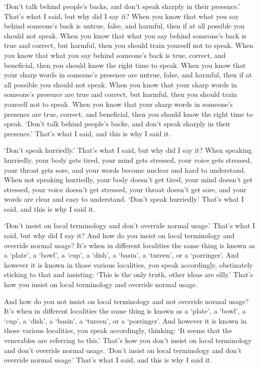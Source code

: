 \documentclass[12pt,openany]{book}%
\begin{document}
‘Don’t talk behind people’s backs, and don’t speak sharply in their presence.’ That’s what I said, but why did I say it? When you know that what you say behind someone’s back is untrue, false, and harmful, then if at all possible you should not speak. When you know that what you say behind someone’s back is true and correct, but harmful, then you should train yourself not to speak. When you know that what you say behind someone’s back is true, correct, and beneficial, then you should know the right time to speak. When you know that your sharp words in someone’s presence are untrue, false, and harmful, then if at all possible you should not speak. When you know that your sharp words in someone’s presence are true and correct, but harmful, then you should train yourself not to speak. When you know that your sharp words in someone’s presence are true, correct, and beneficial, then you should know the right time to speak. ‘Don’t talk behind people’s backs, and don’t speak sharply in their presence.’ That’s what I said, and this is why I said it. 

‘Don’t speak hurriedly.’ That’s what I said, but why did I say it? When speaking hurriedly, your body gets tired, your mind gets stressed, your voice gets stressed, your throat gets sore, and your words become unclear and hard to understand. When not speaking hurriedly, your body doesn’t get tired, your mind doesn’t get stressed, your voice doesn’t get stressed, your throat doesn’t get sore, and your words are clear and easy to understand. ‘Don’t speak hurriedly.’ That’s what I said, and this is why I said it. 

‘Don’t insist on local terminology and don’t override normal usage.’ That’s what I said, but why did I say it? And how do you insist on local terminology and override normal usage? It’s when in different localities the same thing is known as a ‘plate’, a ‘bowl’, a ‘cup’, a ‘dish’, a ‘basin’, a ‘tureen’, or a ‘porringer’. And however it is known in those various localities, you speak accordingly, obstinately sticking to that and insisting: ‘This is the only truth, other ideas are silly.’ That’s how you insist on local terminology and override normal usage. 

And how do you not insist on local terminology and not override normal usage? It’s when in different localities the same thing is known as a ‘plate’, a ‘bowl’, a ‘cup’, a ‘dish’, a ‘basin’, a ‘tureen’, or a ‘porringer’. And however it is known in those various localities, you speak accordingly, thinking: ‘It seems that the venerables are referring to this.’ That’s how you don’t insist on local terminology and don’t override normal usage. ‘Don’t insist on local terminology and don’t override normal usage.’ That’s what I said, and this is why I said it. 
\end{document}
